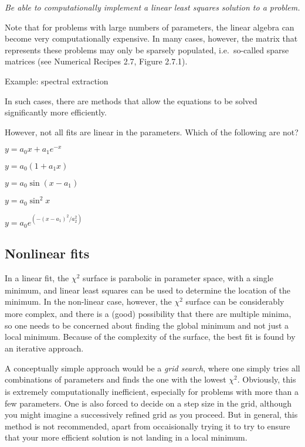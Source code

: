 \documentclass[12pt]{article}
\begin{document}
\colorbox{hl}{\parbox{0.9\textwidth}
{\emph{Be able to computationally implement a linear least squares solution
to a problem.}}}

Note that for problems with large numbers of parameters, the linear algebra
can become very computationally expensive. In many cases, however, the
matrix that represents these problems may only be sparsely populated,
i.e.\ so-called sparse matrices (see Numerical Recipes 2.7, Figure 2.7.1).

Example: spectral extraction

In such cases, there are methods that allow the equations to be solved
significantly more efficiently.

However, not all fits are linear in the parameters. Which of the
following are not?
\begin{itemize*}
    \item $y = a_{0}x + a_{1}e^{-x}$
    \item $y = a_{0}(1 + a_{1}x)$
    \item $y = a_{0}\sin(x - a_{1})$
    \item $y = a_{0}\sin^{2}x$
    \item $y = a_{0}e^{(-(x-a_{1})^{2}/a_{2}^{2})}$
\end{itemize*}

\subsection{Nonlinear fits}

In a linear fit, the $ \chi^{2}_{}$ surface is parabolic in parameter
space, with a single minimum, and linear least squares can be used to
determine the location of the minimum. In the non-linear case, however, the
$ \chi^{2}_{}$ surface can be considerably more complex, and there is a
(good) possibility that there are multiple minima, so one needs to be
concerned about finding the global minimum and not just a local minimum.
Because of the complexity of the surface, the best fit is found by an
iterative approach.

A conceptually simple approach would be a \emph{grid search}, where one simply
tries all combinations of parameters and finds the one with the lowest $
\chi^{2}_{}$. Obviously, this is extremely computationally inefficient,
especially for problems with more than a few parameters. One is also forced
to decide on a step size in the grid, although you might imagine a
successively refined grid as you proceed. But in general, this method is
not recommended, apart from occaisionally trying it to try to ensure that
your more efficient solution is not landing in a local minimum.
\end{document}
